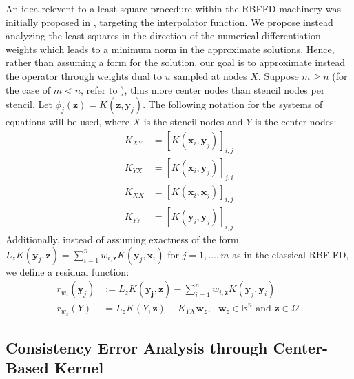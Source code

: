 \documentclass[11pt]{article}
\begin{document}
An idea relevent to a least square procedure within the RBFFD machinery was initially proposed in \cite{Shaback2003}, targeting the interpolator function. We propose instead analyzing the least squares in the direction of the numerical differentiation weights which leads to a minimum norm in the approximate solutions. Hence, rather than assuming a form for the solution, our goal is to approximate instead the operator through weights dual to $u$ sampled at nodes $X$. Suppose $m \ge n$ (for the case of $m < n$, refer to \cite{Slak}), thus more center nodes than stencil nodes per stencil. Let $\phi_j(\bm{z}) = K(\bm{z}, \bm{y}_j)$. The following notation for the systems of equations will be used, where $X$ is the stencil nodes and $Y$ is the center nodes:
\begin{align*}
K_{XY} &= [K(\bm{x}_i, \bm{y}_j)]_{i,j}\\
K_{YX} &= [K(\bm{x}_i, \bm{y}_j)]_{j,i}\\
K_{XX} &= [K(\bm{x}_i, \bm{x}_j)]_{i,j}\\
K_{YY} &= [K(\bm{y}_i, \bm{y}_j)]_{i,j}
\end{align*}
 Additionally, instead of assuming exactness of the form $L_zK(\bm{y}_j,\bm{z}) = \sum_{i=1}^n w_{i,\bm{z}} K(\bm{y}_j,\bm{x}_i)$ for $j = 1, \hdots, m$ as in the classical RBF-FD, we define a residual function:
\begin{align*}
	r_{w_z}(\bm{y}_j) &:= L_zK(\bm{y_j},\bm{z}) - \sum_{i=1}^n w_{i,\bm{z}} K(\bm{y}_j,\bm{y}_i)\\
	r_{w_z} (Y) &= L_zK(Y, \bm{z}) - K_{YX} \bm{w}_z, \text{ } \bm{w}_z \in \mathbb{R}^n \text{ and } \bm{z} \in \Omega.
\end{align*}

\subsection{Consistency Error Analysis through Center-Based Kernel}
\end{document}
